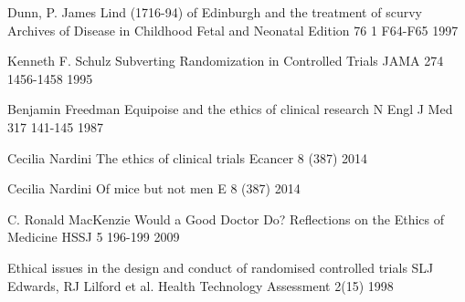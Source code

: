 \documentclass[12p]{article}
\begin{document}
  \begin{thebibliography}{9}
  
  
  Dunn, P.
  James Lind (1716-94) of Edinburgh and the treatment of scurvy
  Archives of Disease in Childhood Fetal and Neonatal Edition
  76
  1
  F64-F65
  1997
  
  Kenneth F. Schulz
  Subverting Randomization in Controlled Trials
  JAMA
  274
  1456-1458
  1995
  
  Benjamin Freedman
  Equipoise and the ethics of clinical research
  N Engl J Med
  317
  141-145
  1987
  
  Cecilia Nardini
  The ethics of clinical trials
  Ecancer
  8
  (387)
  2014
  
  Cecilia Nardini
  Of mice but not men
  E
  8
  (387)
  2014

C. Ronald MacKenzie  
Would a Good Doctor Do? Reflections on the Ethics of Medicine
HSSJ
5
196-199
2009

Ethical issues in the design and conduct of randomised controlled trials
SLJ Edwards, RJ Lilford et al.
Health Technology Assessment 
2(15)
1998


  \end{thebibliography}
 
\end{document}
